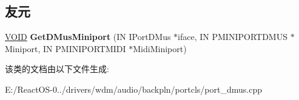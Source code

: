 \subsection*{友元}
\begin{DoxyCompactItemize}
\item 
\mbox{\label{class_c_port_d_mus_ae6d3b943e37a192babe8604398aad030}} 
\hyperlink{interfacevoid}{V\+O\+ID} {\bfseries Get\+D\+Mus\+Miniport} (IN I\+Port\+D\+Mus $\ast$iface, IN P\+M\+I\+N\+I\+P\+O\+R\+T\+D\+M\+US $\ast$Miniport, IN P\+M\+I\+N\+I\+P\+O\+R\+T\+M\+I\+DI $\ast$Midi\+Miniport)
\end{DoxyCompactItemize}


该类的文档由以下文件生成\+:\begin{DoxyCompactItemize}
\item 
E\+:/\+React\+O\+S-\/0../drivers/wdm/audio/backpln/portcls/port\+\_\+dmus.\+cpp\end{DoxyCompactItemize}
